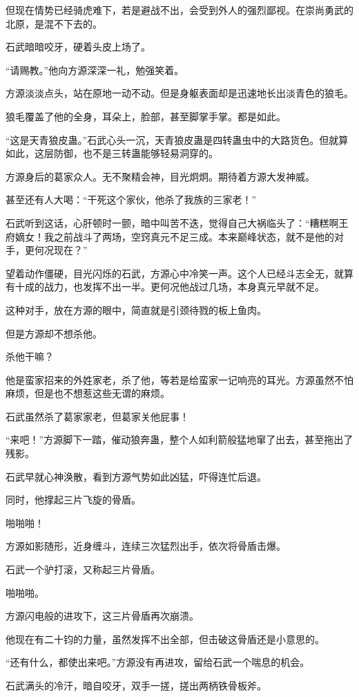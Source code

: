\begin{this_body}
但现在情势已经骑虎难下，若是避战不出，会受到外人的强烈鄙视。在崇尚勇武的北原，是混不下去的。

石武暗暗咬牙，硬着头皮上场了。

“请赐教。”他向方源深深一礼，勉强笑着。

方源淡淡点头，站在原地一动不动。但是身躯表面却是迅速地长出淡青色的狼毛。

狼毛覆盖了他的全身，耳朵上，脸部，甚至脚掌手掌。都是如此。

“这是天青狼皮蛊。”石武心头一沉，天青狼皮蛊是四转蛊虫中的大路货色。但就算如此，这层防御，也不是三转蛊能够轻易洞穿的。

方源身后的葛家众人。无不聚精会神，目光炯炯。期待着方源大发神威。

甚至还有人大喝：“干死这个家伙，他杀了我族的三家老！”

石武听到这话，心肝顿时一颤，暗中叫苦不迭，觉得自己大祸临头了：“糟糕啊王府嫡女！我之前战斗了两场，空窍真元不足三成。本来巅峰状态，就不是他的对手，更何况现在？”

望着动作僵硬，目光闪烁的石武，方源心中冷笑一声。这个人已经斗志全无，就算有十成的战力，也发挥不出一半。更何况他战过几场，本身真元早就不足。

这种对手，放在方源的眼中，简直就是引颈待戮的板上鱼肉。

但是方源却不想杀他。

杀他干嘛？

他是蛮家招来的外姓家老，杀了他，等若是给蛮家一记响亮的耳光。方源虽然不怕麻烦，但是也不想惹这些无谓的麻烦。

石武虽然杀了葛家家老，但葛家关他屁事！

“来吧！”方源脚下一踏，催动狼奔蛊，整个人如利箭般猛地窜了出去，甚至拖出了残影。

石武早就心神涣散，看到方源气势如此凶猛，吓得连忙后退。

同时，他撑起三片飞旋的骨盾。

啪啪啪！

方源如影随形，近身缠斗，连续三次猛烈出手，依次将骨盾击爆。

石武一个驴打滚，又称起三片骨盾。

啪啪啪。

方源闪电般的进攻下，这三片骨盾再次崩溃。

他现在有二十钧的力量，虽然发挥不出全部，但击破这骨盾还是小意思的。

“还有什么，都使出来吧。”方源没有再进攻，留给石武一个喘息的机会。

石武满头的冷汗，暗自咬牙，双手一搓，搓出两柄铁骨板斧。


\end{this_body}
